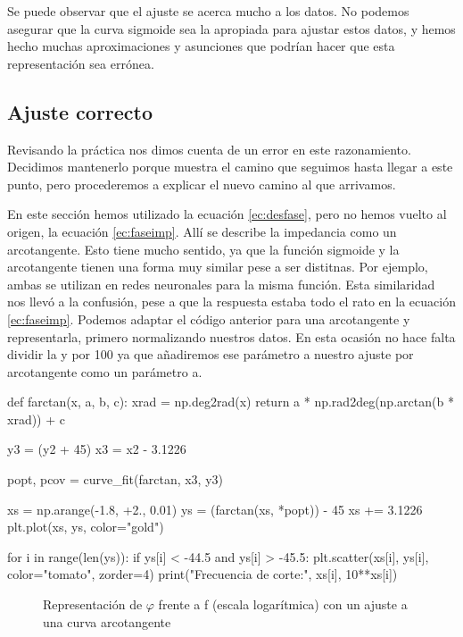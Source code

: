\documentclass[12pt, a4paper, titlepage]{article}
\begin{document}
  Se puede observar que el ajuste se acerca mucho a los datos. No podemos asegurar que la curva sigmoide sea la apropiada para ajustar estos datos, y hemos hecho muchas aproximaciones y asunciones que podrían hacer que esta representación sea errónea.

  \subsection{Ajuste correcto}
  \label{sec:arctg}

  Revisando la práctica nos dimos cuenta de un error en este razonamiento. Decidimos mantenerlo porque muestra el camino que seguimos hasta llegar a este punto, pero procederemos a explicar el nuevo camino al que arrivamos.

  En este sección hemos utilizado la ecuación \ref{ec:desfase}, pero no hemos vuelto al origen, la ecuación \ref{ec:faseimp}. Allí se describe la impedancia como un arcotangente. Esto tiene mucho sentido, ya que la función sigmoide y la arcotangente tienen una forma muy similar pese a ser distitnas. Por ejemplo, ambas se utilizan en redes neuronales para la misma función. Esta similaridad nos llevó a la confusión, pese a que la respuesta estaba todo el rato en la ecuación \ref{ec:faseimp}. Podemos adaptar el código anterior para una arcotangente y representarla, primero normalizando nuestros datos. En esta ocasión no hace falta dividir la y por 100 ya que añadiremos ese parámetro a nuestro ajuste por arcotangente como un parámetro a.

  \begin{python}
    def farctan(x, a, b, c):
        xrad = np.deg2rad(x)
        return a * np.rad2deg(np.arctan(b * xrad)) + c

    y3 = (y2 + 45)
    x3 = x2 - 3.1226

    popt, pcov = curve_fit(farctan, x3, y3)

    xs = np.arange(-1.8, +2., 0.01)
    ys = (farctan(xs, *popt)) - 45
    xs += 3.1226
    plt.plot(xs, ys, color="gold")

    for i in range(len(ys)):
        if ys[i] < -44.5 and ys[i] > -45.5:
            plt.scatter(xs[i], ys[i], color="tomato", zorder=4)
            print("Frecuencia de corte:", xs[i], 10**xs[i])
  \end{python}

  \begin{figure}[H]
    \hspace{2.5em} 
    \caption{Representación de $\varphi$ frente a f (escala logarítmica) con un ajuste a una curva arcotangente}
  \end{figure}
\end{document}
